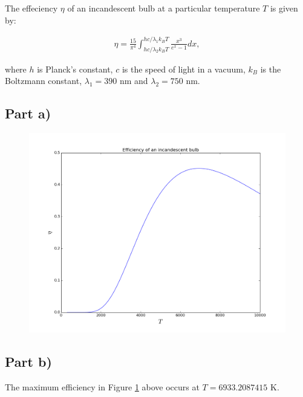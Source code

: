\documentclass[a4paper,12pt]{article}
\begin{document}
The effeciency $\eta$ of an incandescent bulb at a particular temperature $T$ is given by:

\begin{eqnarray}
\eta = \frac{15}{\pi^4}\int_{hc/\lambda_2 k_B T}^{hc/\lambda_1 k_B T} \frac{x^3}{e^x - 1} dx,\nonumber
\end{eqnarray}

where $h$ is Planck's constant, $c$ is the speed of light in a vacuum, $k_B$ is the Boltzmann constant, $\lambda_1 = 390$ nm and $\lambda_2 = 750$ nm.

\subsection{Part a)}

\begin{figure}[H]
\centering
\includegraphics[width = \linewidth]{lab4q6a.png}
\caption{}
\label{fig:q6}
\end{figure}

\subsection{Part b)}

The maximum efficiency in Figure \ref{fig:q6} above occurs at $T = 6933.2087415$ K.
\end{document}
